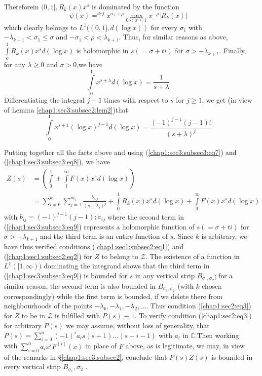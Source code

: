 Therefore\pageoriginale in $(0,1],R_{k}(x)x^{s}$ is dominated by the function
\begin{equation*}
\psi(x){\displaystyle{\mathop{=}^{def}}} x^{\sigma_{1}+\rho}
    {\displaystyle{\mathop{max}_{0<x\le 1}}} x^{-\rho}|R_{k}(x)|
\end{equation*}
 which clearly belongs to $L^{1}((0,1],d(\log x))$ for every
   $\sigma_{1}$ with $-\lambda_{k+1}<\sigma_{1}\le\sigma$ and
   $-\sigma_{1}<\rho<\lambda_{k+1}$. Thus, for similar reasons as
   above, $\int\limits_{o}^{1}R_{k}(x)x^{s}d(\log x)$ is holomorphic
   in $s(=\sigma+ti)$ for $\sigma>-\lambda_{k+1}$. Finally, for any
   $\lambda\ge0$ and $\sigma>0$,we have
\begin{equation*}
\int\limits_{0}^{1}x^{s+\lambda}d(\log x)=\frac{1}{s+\lambda}
\end{equation*}
Differentiating the integral $j-1$ times with respect to $s$ for $j\ge
1$, we get (in view of Lemma \ref{chap1:sec3:subsec2:lem2})that
\begin{equation*}
  \int\limits_{0}^{1}x^{s+1}(\log x)^{j-1} d(\log x)
  =\frac{(-1)^{j-1}(j-1)!}{(s+\lambda)^{j}}\tag{8}\label{chap1:sec3:subsec3:eq8}
\end{equation*}

Putting together all the facts above and using
(\ref{chap1:sec3:subsec3:eq7}) and (\ref{chap1:sec3:subsec3:eq8}), we
have
\begin{align*}
  Z(s) & = \left(\int\limits_{0}^{1}+\int\limits_{1}^{\infty}F(x)x^{s} d(\log
  x)\right)\\
  &
  =\sum\limits_{i=0}^{k}\sum\limits_{j=1}^{m_{i}}
  \frac{b_{i,j}}{(s+\lambda_{i})^{j}} +\int\limits_{0}^{1}R_{k}(x)x^{s}d(\log 
  x)+\int\limits_{0}^{\infty}F(x)x^{s}d(\log
  x)\tag{9}\label{chap1:sec3:subsec3:eq9} 
\end{align*}
with $b_{ij}=(-1)^{j-1}(j-1);a_{ij}$ where the second term in
(\ref{chap1:sec3:subsec3:eq9}) 
represents a holomorphic function of $s(=\sigma+ti)$ for $\sigma>
-\lambda_{k+1}$ and the third term is an entire function of $s$. Since
$k$ is arbitrary, we have thus verified conditions
(\ref{chap1:sec1:subsec2:eq1}) and (\ref{chap1:sec1:subsec2:eq2}) for
$Z$ to belong to $\mathscr{Z}$. The existence of a function in
$L^{1}([1,\infty))$ dominating the integrand shows that the third term
  in (\ref{chap1:sec3:subsec3:eq9}) is bounded for $s$ in any vertical strip\pageoriginale
  $B_{\sigma_{1},\sigma_{2}}$; for a similar reason, the second term
is also bounded in $B_{\sigma_{1}, \sigma_{2}}$ (with $k$ chosen
  correspondingly) while the first term is bounded, if we delete
  there from neighbourhoods of the points
  $-\lambda_{0},-\lambda_{1},-\lambda_{2},\ldots$. Thus condition
  (\ref{chap1:sec2:eq3}) for $Z$ to be in $\mathscr{Z}$ is fulfilled with $P(s)\equiv
  1$. To verify condition (\ref{chap1:sec2:eq3}) for arbitrary $P(s)$ we may assume,
  without loss of generality, that
  $P(s)=\sum\limits_{i=0}^{n}(-1)^{i}a_{i}s(s+1)\ldots(s+i-1)$ with
  $a_{i}$ in $\mathbb{C}$.Then working with
  $\sum\limits_{i=0}^{n}a_{i}x^{i}F^{(i)}(x)$ in place of $F$ above,
  as is legitimate, we may, in view of the remarks in
  \S \ref{chap1:sec3:subsec2},
  conclude that $P(s)Z(s)$ is bounded in every vertical strip
  $B_{\sigma_{1}},{\sigma_{2}}$ .

